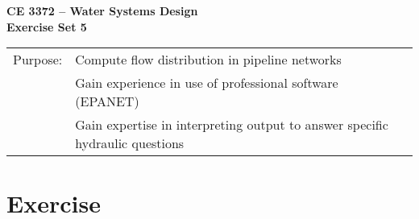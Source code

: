 \documentclass[12pt]{article}
\begin{document}
\begin{center}
{\textbf{{ CE 3372 -- Water Systems Design} \\ {Exercise Set 5}}}
\end{center}
\begingroup
\begin{tabular}{p{1in} p{5in}}
Purpose: & Compute flow distribution in pipeline networks \\
~ & Gain experience in use of professional software (EPANET) \\
~ & Gain expertise in interpreting output to answer specific hydraulic questions \\

\end{tabular}
\endgroup
\section*{\small{Exercise}}
\end{document}
